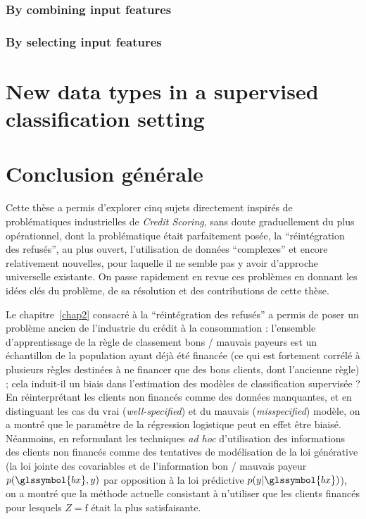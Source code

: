 \subsubsection{By combining input features}



\subsubsection{By selecting input features}


\section{New data types in a supervised classification setting}




\section{Conclusion générale}

Cette thèse a permis d'explorer cinq sujets directement inspirés de problématiques industrielles de \textit{Credit Scoring}, sans doute graduellement du plus opérationnel, dont la problématique était parfaitement posée, la ``réintégration des refusés'', au plus ouvert, l'utilisation de données ``complexes'' et encore relativement nouvelles, pour laquelle il ne semble pas y avoir d'approche universelle existante. On passe rapidement en revue ces problèmes en donnant les idées clés du problème, de sa résolution et des contributions de cette thèse.

\medskip

Le chapitre~\ref{chap2} consacré à la ``réintégration des refusés'' a permis de poser un problème ancien de l'industrie du crédit à la consommation : l'ensemble d'apprentissage de la règle de classement bons / mauvais payeurs est un échantillon de la population ayant déjà été financée (ce qui est fortement corrélé à plusieurs règles destinées à ne financer que des bons clients, dont l'ancienne règle) ; cela induit-il un biais dans l'estimation des modèles de classification supervisée ? En réinterprétant les clients non financés comme des données manquantes, et en distinguant les cas du vrai (\textit{well-specified}) et du mauvais (\textit{misspecified}) modèle, on a montré que le paramètre de la régression logistique peut en effet être biaisé. Néanmoins, en reformulant les techniques \textit{ad hoc} d'utilisation des informations des clients non financés comme des tentatives de modélisation de la loi générative (la loi jointe des covariables et de l'information bon / mauvais payeur $p(\glssymbol{bx},y)$ par opposition à la loi prédictive $p(y | \glssymbol{bx})$), on a montré que la méthode actuelle consistant à n'utiliser que les clients financés pour lesquels $Z = \text{f}$ était la plus satisfaisante.

